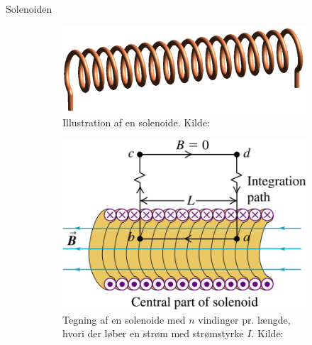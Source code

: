 \documentclass[crop=false, class=memoir]{standalone}
\begin{document}
\begin{opgave}[3]{Solenoiden}
\begin{figure}
    \centering
    \begin{subfigure}[t]{.47\textwidth}
        \includegraphics[width=\columnwidth]{Elektro/Elekfig/Solenoid-1.png}
        \caption{Illustration af en solenoide. Kilde: \cite{SolenoidWikipedia2019}}
        \label{fig:solenoide}
    \end{subfigure}
    \hfill
    \begin{subfigure}[t]{.47\textwidth}
        \includegraphics[width=\columnwidth]{Elektro/Elekfig/solenoid.png}
        \caption{Tegning af en solenoide med $n$ vindinger pr. længde, hvori der løber en strøm med strømstyrke $I$. Kilde: \cite{UY1ApplicationsAmpere2015}}
        \label{fig:solenoide_ampere}
    \end{subfigure}
    \caption{ }
\end{figure}
\end{opgave}
\end{document}
